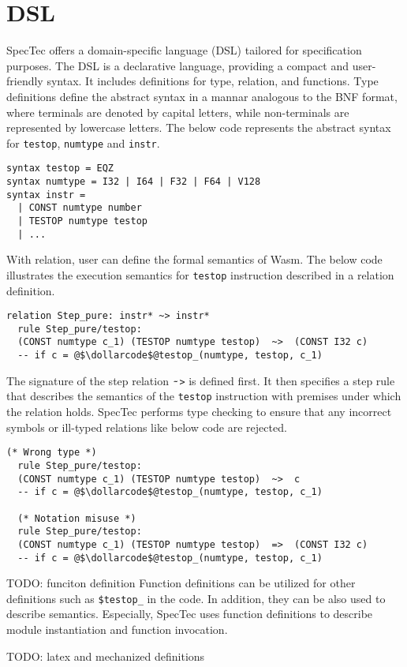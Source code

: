 
\chapter{DSL}
\label{ch:dsl}
\noindent


SpecTec offers a domain-specific language (DSL) tailored for specification
purposes.
The DSL is a declarative language, providing a compact and user-friendly syntax.
It includes definitions for type, relation, and functions.
Type definitions define the abstract syntax in a mannar analogous to the BNF
format, where terminals are denoted by capital letters, while non-terminals are
represented by lowercase letters.
The below code represents the abstract syntax for \texttt{testop},
\texttt{numtype} and \texttt{instr}.
\begin{lstlisting}[style=dsl]
syntax testop = EQZ
syntax numtype = I32 | I64 | F32 | F64 | V128
syntax instr =
  | CONST numtype number
  | TESTOP numtype testop
  | ...
\end{lstlisting}

With relation, user can define the formal semantics of Wasm.
The below code illustrates the execution semantics for \texttt{testop}
instruction described in a relation definition.
\begin{lstlisting}[style=dsl]
  relation Step_pure: instr* ~> instr*
  rule Step_pure/testop:
  (CONST numtype c_1) (TESTOP numtype testop)  ~>  (CONST I32 c)
  -- if c = @$\dollarcode$@testop_(numtype, testop, c_1)
\end{lstlisting}
The signature of the step relation $\tildecode$\texttt{>} is defined first.
It then specifies a step rule that describes the semantics of the
\texttt{testop} instruction with premises under which the relation holds.
SpecTec performs type checking to ensure that any incorrect symbols or
ill-typed relations like below code are rejected.
\begin{lstlisting}[style=dsl]
  (* Wrong type *)
  rule Step_pure/testop:
  (CONST numtype c_1) (TESTOP numtype testop)  ~>  c
  -- if c = @$\dollarcode$@testop_(numtype, testop, c_1)

  (* Notation misuse *)
  rule Step_pure/testop:
  (CONST numtype c_1) (TESTOP numtype testop)  =>  (CONST I32 c)
  -- if c = @$\dollarcode$@testop_(numtype, testop, c_1)
\end{lstlisting}


TODO: funciton definition
Function definitions can be utilized for other definitions such as
\texttt{\$testop\_} in the code.
In addition, they can be also used to describe semantics.
Especially, SpecTec uses function definitions to describe module instantiation
and function invocation.

TODO: latex and mechanized definitions
